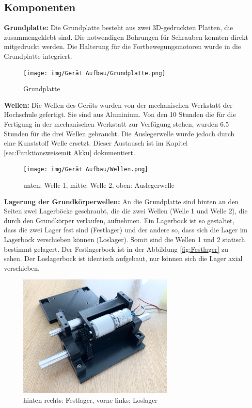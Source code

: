 \newpage

\subsection{Komponenten}
\label{subsec:Komponenten}

\textbf{Grundplatte:} Die Grundplatte besteht aus zwei 3D-gedruckten Platten, die zusammengeklebt sind. Die notwendigen Bohrungen für Schrauben konnten direkt mitgedruckt werden. Die Halterung für die Fortbewegungsmotoren wurde in die Grundplatte integriert.

\begin{figure}[H]
  \texttt{[image: img/Gerät Aufbau/Grundplatte.png]}
  \centering
  \caption{Grundplatte}
  \label{fig:Grundplatte}
\end{figure}

\textbf{Wellen:} Die Wellen des Geräts wurden von der mechanischen Werkstatt der Hochschule gefertigt. Sie sind aus Aluminium. Von den 10 Stunden die für die Fertigung in der mechanischen Werkstatt zur Verfügung stehen, wurden 6.5 Stunden für die drei Wellen gebraucht. Die Auslegerwelle wurde jedoch durch eine Kunststoff Welle ersetzt. Dieser Austausch ist im Kapitel \ref{sec:Funktionsweisemit Akku} dokumentiert.

\begin{figure}[H]
  \texttt{[image: img/Gerät Aufbau/Wellen.png]}
  \centering
  \caption{unten: Welle 1, mitte: Welle 2, oben: Auslegerwelle}
  \label{fig:Wellen}
\end{figure}

\newpage

\textbf{Lagerung der Grundkörperwellen:} An die Grundplatte sind hinten an den Seiten zwei Lagerböcke geschraubt, die die zwei Wellen (Welle 1 und Welle 2), die durch den Grundkörper verlaufen, aufnehmen. Ein Lagerbock ist so gestaltet, dass die zwei Lager fest sind (Festlager) und der andere so, dass sich die Lager im Lagerbock verschieben können (Loslager). Somit sind die Wellen 1 und 2 statisch bestimmt gelagert. Der Festlagerbock ist in der Abbildung \ref{fig:Festlager} zu sehen. Der Loslagerbock ist identisch aufgebaut, nur können sich die Lager axial verschieben.

\begin{figure}[H]
  \includegraphics[width=0.7\textwidth]{img/Gerät Aufbau/Lagerböcke.png}
  \centering
  \caption{hinten rechts: Festlager, vorne links: Loslager}
  \label{fig:Lagerung}
\end{figure}

